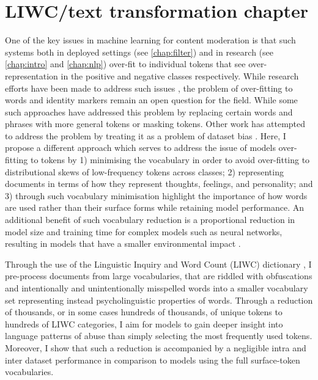 \ifpdf
    \graphicspath{{Chapter4/Figs/Raster/}{Chapter4/Figs/PDF/}{Chapter4/Figs/}}
\else
    \graphicspath{{Chapter4/Figs/Vector/}{Chapter4/Figs/}}
\fi

\chapter{LIWC/text transformation chapter}\label{chap:liwc}

One of the key issues in machine learning for content moderation is that such systems both in deployed settings (see \autoref{chap:filter}) and in research (see \autoref{chap:intro} and \autoref{chap:nlp}) over-fit to individual tokens that see over-representation in the positive and negative classes respectively. While research efforts have been made to address such issues \cite{CITE: cite papers that try to address overfitting}, the problem of over-fitting to words and identity markers remain an open question for the field. While some such approaches have addressed this problem by replacing certain words and phrases with more general tokens \cite{CITE: Replacing token papers} or masking \cite{CITE: Masking token paper} tokens. Other work has attempted to address the problem by treating it as a problem of dataset bias \cite{Dixon:2018}. Here, I propose a different approach which serves to address the issue of models over-fitting to tokens by 1) minimising the vocabulary in order to avoid over-fitting to distributional skews of low-frequency tokens across classes; 2) representing documents in terms of how they represent thoughts, feelings, and personality; and 3) through such vocabulary minimisation highlight the importance of how words are used rather than their surface forms while retaining model performance. An additional benefit of such vocabulary reduction is a proportional reduction in model size and training time for complex models such as neural networks, resulting in models that have a smaller environmental impact \citep{Strubell:2019}.

Through the use of the Linguistic Inquiry and Word Count (LIWC) dictionary \cite{LIWC:2015,Original LIWC Citation}, I pre-process documents from large vocabularies, that are riddled with obfuscations and intentionally and unintentionally misspelled words into a smaller vocabulary set representing instead psycholinguistic properties of words. Through a reduction of thousands, or in some cases hundreds of thousands, of unique tokens to hundreds of LIWC categories, I aim for models to gain deeper insight into language patterns of abuse than simply selecting the most frequently used tokens. Moreover, I show that such a reduction is accompanied by a negligible intra and inter dataset performance in comparison to models using the full surface-token vocabularies.

